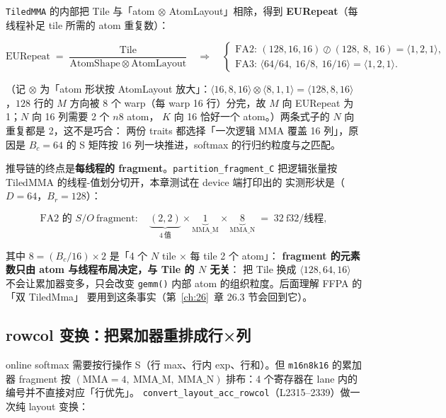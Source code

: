 \texttt{TiledMMA} 的内部把 Tile 与「atom $\otimes$ AtomLayout」相除，得到
\textbf{EURepeat}（每线程补足 tile 所需的 atom 重复数）：

\begin{equation}
  \mathrm{EURepeat} \;=\; \frac{\mathrm{Tile}}{\mathrm{AtomShape}\otimes \mathrm{AtomLayout}}
  \quad\Longrightarrow\quad
  \begin{cases}
    \text{FA2: } (128,16,16)\oslash(128,\ 8,\ 16) = \langle 1,2,1\rangle,\\[2pt]
    \text{FA3: } \langle 64/64,\ 16/8,\ 16/16\rangle = \langle 1,2,1\rangle .
  \end{cases}
  \label{eq:25-eurepeat}
\end{equation}

（记 $\otimes$ 为「atom 形状按 AtomLayout 放大」：$\langle16,8,16\rangle\otimes
\langle8,1,1\rangle=\langle128,8,16\rangle$，$128$ 行的 $M$ 方向被 8 个
warp（每 warp 16 行）分完，故 $M$ 向 EURepeat 为 1；$N$ 向 16 列需要 2 个 $n8$ atom，
$K$ 向 16 恰好一个 atom。）两条式子的 $N$ 向重复都是 2，这不是巧合：
两份 traits 都选择「一次逻辑 MMA 覆盖 16 列」，原因是 $B_c=64$ 的
S 矩阵按 16 列一块推进，softmax 的行归约粒度与之匹配。

推导链的终点是\textbf{每线程的 fragment}。\texttt{partition\_\allowbreak{}fragment\_\allowbreak{}C}
把逻辑张量按 TiledMMA 的线程-值划分切开，本章测试在 device 端打印出的
实测形状是（$D{=}64$，$B_r{=}128$）：

\begin{equation}
  \text{FA2 的 } S/O\ \text{fragment}:\quad
  \underbrace{(2,2)}_{4\ \text{值}}\times\underbrace{1}_{\text{MMA\_M}}
  \times\underbrace{8}_{\text{MMA\_N}} \;=\; 32\ \text{f32/线程},
  \label{eq:25-frag}
\end{equation}

其中 $8 = (B_c/16)\times 2$ 是「4 个 $N$ tile × 每 tile 2 个 atom」：
\textbf{fragment 的元素数只由 atom 与线程布局决定，与 Tile 的 $N$ 无关}：
把 Tile 换成 $\langle128,64,16\rangle$ 不会让累加器变多，只会改变
\texttt{gemm()} 内部 atom 的组织粒度。后面理解 FFPA 的「双 TiledMma」
要用到这条事实（第~\ref{ch:26}~章 26.3 节会回到它）。

\subsection{rowcol 变换：把累加器重排成行×列}

online softmax 需要按行操作 S（行 max、行内 exp、行和）。但
\texttt{m16n8k16} 的累加器 fragment 按 $(\mathrm{MMA}=4,\ \mathrm{MMA\_M},\
\mathrm{MMA\_N})$ 排布：4 个寄存器在 lane 内的编号并不直接对应「行优先」。
\texttt{convert\_\allowbreak{}layout\_\allowbreak{}acc\_\allowbreak{}rowcol}（L2315--2339）做一次纯 layout 变换：

